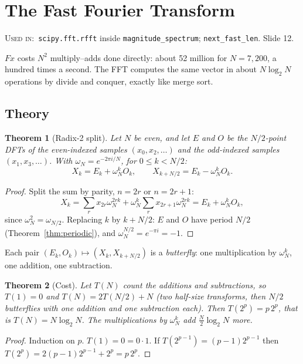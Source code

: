 \documentclass[11pt]{article}
\newtheorem{theorem}{Theorem}[section]
\theoremstyle{definition}
\newcommand{\code}[1]{\texttt{#1}}
\newcommand{\usedin}[1]{\par\noindent\colorbox{black!8}{\parbox{\dimexpr\linewidth-2\fboxsep\relax}{\small\textsc{Used in:}~#1}}\par\medskip}
\begin{document}
\section{The Fast Fourier Transform}\label{sec:fft}
\usedin{\code{scipy.fft.rfft} inside \code{magnitude\_spectrum};
\code{next\_fast\_len}. Slide 12.}

$Fx$ costs $N^2$ multiply--adds done directly: about 52 million for $N=7{,}200$, a
hundred times a second. The FFT computes the same vector in about $N\log_2N$
operations by divide and conquer, exactly like merge sort.

\subsection{Theory}

\begin{theorem}[Radix-2 split]\label{thm:radix2}
Let $N$ be even, and let $E$ and $O$ be the $N/2$-point DFTs of the even-indexed
samples $(x_0,x_2,\dots)$ and the odd-indexed samples $(x_1,x_3,\dots)$. With
$\omega_N=e^{-2\pi i/N}$, for $0\le k<N/2$:
\[
X_k=E_k+\omega_N^kO_k,\qquad X_{k+N/2}=E_k-\omega_N^kO_k.
\]
\end{theorem}
\begin{proof}
Split the sum by parity, $n=2r$ or $n=2r+1$:
\[
X_k=\sum_{r}x_{2r}\omega_N^{2rk}+\omega_N^k\sum_rx_{2r+1}\omega_N^{2rk}
=E_k+\omega_N^kO_k,
\]
since $\omega_N^2=\omega_{N/2}$. Replacing $k$ by $k+N/2$: $E$ and $O$ have period
$N/2$ (Theorem~\ref{thm:periodic}), and $\omega_N^{N/2}=e^{-\pi i}=-1$.
\end{proof}

Each pair $(E_k,O_k)\mapsto(X_k,X_{k+N/2})$ is a \emph{butterfly}: one multiplication
by $\omega_N^k$, one addition, one subtraction.

\begin{theorem}[Cost]\label{thm:fftcost}
Let $T(N)$ count the additions and subtractions, so $T(1)=0$ and $T(N)=2T(N/2)+N$
(two half-size transforms, then $N/2$ butterflies with one addition and one subtraction
each). Then $T(2^p)=p\,2^p$, that is $T(N)=N\log_2N$. The multiplications by
$\omega_N^k$ add $\frac N2\log_2N$ more.
\end{theorem}
\begin{proof}
Induction on $p$. $T(1)=0=0\cdot1$. If $T(2^{p-1})=(p-1)2^{p-1}$ then
$T(2^p)=2(p-1)2^{p-1}+2^p=p\,2^p$.
\end{proof}
\end{document}
